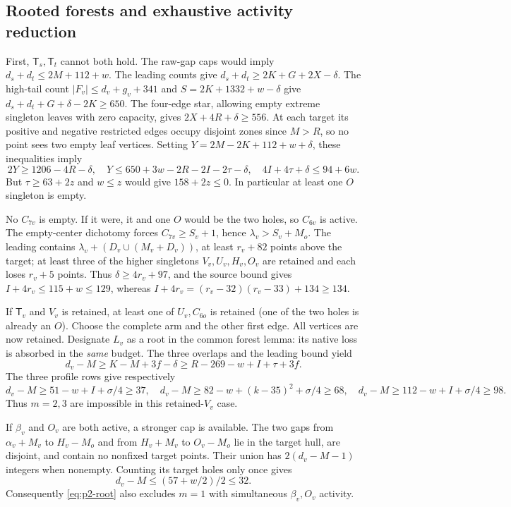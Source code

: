 \documentclass[11pt,letterpaper]{article}
\theoremstyle{definition}\newtheorem{definition}[theorem]{Definition}
\begin{document}
\subsection{Rooted forests and exhaustive activity reduction}
First, $\mathsf T_s,\mathsf T_t$ cannot both hold. The raw-gap caps would
imply $d_s+d_t\le2M+112+w$. The leading counts give
$d_s+d_t\ge2K+G+2X-\delta$.
The high-tail count $|F_v|\le d_v+g_v+341$ and
$S=2K+1332+w-\delta$ give
$d_s+d_t+G+\delta-2K\ge650$.
The four-edge star, allowing empty extreme singleton leaves with zero
capacity, gives $2X+4R+\delta\ge556$. At each target its positive and negative restricted edges occupy disjoint zones since $M>R$, so no point sees two empty leaf vertices. Setting
$Y=2M-2K+112+w+\delta$, these inequalities imply
\[
 2Y\ge1206-4R-\delta,
 \quad Y\le650+3w-2R-2I-2\tau-\delta,
 \quad4I+4\tau+\delta\le94+6w.
\]
But $\tau\ge63+2z$ and $w\le z$ would give $158+2z\le0$.
In particular at least one $O$ singleton is empty.

No $C_{7v}$ is empty. If it were, it and one $O$ would be the two holes,
so $C_{6v}$ is active. The empty-center dichotomy forces
$C_{7v}\ge S_v+1$, hence $\lambda_v>S_v+M_o$.
The leading contains $\lambda_v+(D_v\cup(M_v+D_v))$, at least $r_v+82$
points above the target; at least three of the higher singletons
$V_v,U_v,H_v,O_v$ are retained and each loses $r_v+5$ points.
Thus $\delta\ge4r_v+97$, and the source bound gives
$I+4r_v\le115+w\le129$, whereas
$I+4r_v=(r_v-32)(r_v-33)+134\ge134$.

If $\mathsf T_v$ and $V_v$ is retained, at least one of $U_v,C_{6o}$
is retained (one of the two holes is already an $O$). Choose the complete
arm and the other first edge. All vertices are now retained. Designate
$L_v$ as a root in the common forest lemma: its native loss is absorbed
in the \emph{same} budget. The three overlaps and the leading bound yield
\begin{equation}
 d_v-M\ge K-M+3f-\delta
 \ge R-269-w+I+\tau+3f.                   \label{eq:p2-root}
\end{equation}
The three profile rows give respectively
\[
 d_v-M\ge51-w+I+\sigma/4\ge37,\quad
 d_v-M\ge82-w+(k-35)^2+\sigma/4\ge68,\quad
 d_v-M\ge112-w+I+\sigma/4\ge98.
\]
Thus $m=2,3$ are impossible in this retained-$V_v$ case.

If $\beta_v$ and $O_v$ are both active, a stronger cap is available.
The two gaps from $\alpha_v+M_v$ to $H_v-M_o$ and from $H_v+M_v$ to
$O_v-M_o$ lie in the target hull, are disjoint, and contain no nonfixed
target points. Their union has $2(d_v-M-1)$ integers when nonempty.
Counting its target holes only once gives
\begin{equation}
 d_v-M\le(57+w/2)/2\le32.                 \label{eq:p2-two-gap}
\end{equation}
Consequently \eqref{eq:p2-root} also excludes $m=1$ with simultaneous
$\beta_v,O_v$ activity.
\end{document}
